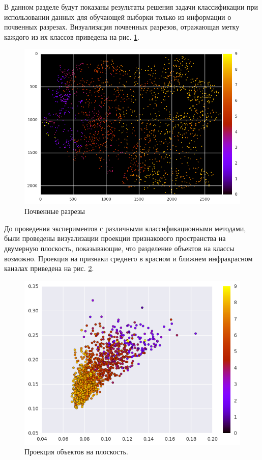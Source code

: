 \documentclass[14pt]{extarticle}
\begin{document}
\par
В данном разделе будут показаны результаты решения задачи классификации при использовании
данных для обучающей выборки только из информации о почвенных разрезах. Визуализация
почвенных разрезов, отражающая метку каждого из их классов приведена на 
рис. \ref{image:cuts}.
\begin{figure}[H]
\centering
\includegraphics[width=\linewidth]{imgs/cuts.png}
\caption{Почвенные разрезы}
\label{image:cuts}
\end{figure}
\par
До проведения экспериментов с различными классификационными методами, были проведены
визуализации проекции признакового пространства на двумерную плоскость, показывающие,
что разделение объектов на классы возможно. Проекция на признаки среднего в красном
и ближнем инфракрасном каналах приведена на рис. \ref{image:projection}.
\begin{figure}[H]
\centering
\includegraphics[width=\linewidth]{imgs/projection.png}
\caption{Проекция объектов на плоскость.}
\label{image:projection}
\end{figure}
\end{document}
